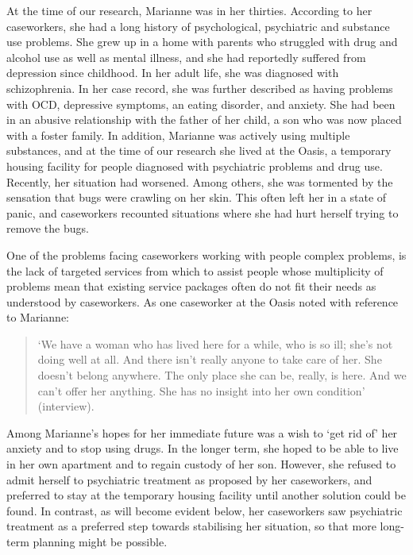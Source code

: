 At the time of our research, Marianne was in her thirties. According to her caseworkers, she had a long history of psychological, psychiatric and substance use problems. She grew up in a home with parents who struggled with drug and alcohol use as well as mental illness, and she had reportedly suffered from depression since childhood. In her adult life, she was diagnosed with schizophrenia. In her case record, she was further described as having problems with OCD, depressive symptoms, an eating disorder, and anxiety. She had been in an abusive relationship with the father of her child, a son who was now placed with a foster family. In addition, Marianne was actively using multiple substances, and at the time of our research she lived at the Oasis, a temporary housing facility for people diagnosed with psychiatric problems and drug use. Recently, her situation had worsened. Among others, she was tormented by the sensation that bugs were crawling on her skin. This often left her in a state of panic, and caseworkers recounted situations where she had hurt herself trying to remove the bugs.
\par
One of the problems facing caseworkers working with people complex problems, is the lack of targeted services from which to assist people whose multiplicity of problems mean that existing service packages often do not fit their needs as understood by caseworkers. As one caseworker at the Oasis noted with reference to Marianne:
    \blockquote{‘We have a woman who has lived here for a while, who is so ill; she’s not doing well at all. And there isn’t really anyone to take care of her. She doesn’t belong anywhere. The only place she can be, really, is here. And we can’t offer her anything. She has no insight into her own condition’ (interview).}
Among Marianne’s hopes for her immediate future was a wish to ‘get rid of’ her anxiety and to stop using drugs. In the longer term, she hoped to be able to live in her own apartment and to regain custody of her son. However, she refused to admit herself to psychiatric treatment as proposed by her caseworkers, and preferred to stay at the temporary housing facility until another solution could be found. In contrast, as will become evident below, her caseworkers saw psychiatric treatment as a preferred step towards stabilising her situation, so that more long-term planning might be possible.

